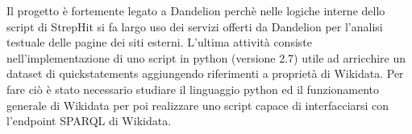 Il progetto è fortemente legato a Dandelion perchè nelle logiche interne dello script di StrepHit si fa largo uso dei servizi offerti da Dandelion per l'analisi testuale delle pagine dei siti esterni.
L'ultima attività consiste nell'implementazione di uno script in python (versione 2.7) utile ad arricchire un dataset di quickstatements aggiungendo riferimenti a proprietà di Wikidata.
Per fare ciò è stato necessario studiare il linguaggio python ed il funzionamento generale di Wikidata per poi realizzare uno script capace di interfacciarsi con l'endpoint SPARQL di Wikidata.

